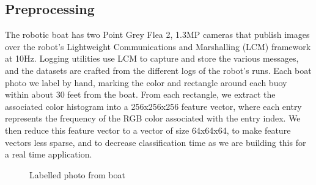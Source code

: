 \documentclass{article} %
\begin{document}
\subsection{Preprocessing}
The robotic boat has two Point Grey Flea 2, 1.3MP cameras that publish images over the robot's Lightweight 
Communications and Marshalling (LCM) framework at 10Hz. Logging utilities use LCM to capture and store the various messages, and the datasets are crafted from the different logs of the robot's runs.
Each boat photo we label by hand, marking the color and rectangle around each buoy within about 30 feet from the boat. From each rectangle, we extract the associated color histogram into a 256x256x256 feature vector, where each entry represents the frequency of the RGB color associated with the entry index. We then reduce this feature vector to a vector of size 64x64x64, to make feature vectors less sparse, and to decrease classification time as we are building this for a real time application.

\begin{figure}[h]
\begin{center}
\end{center}
\caption{Labelled photo from boat}
\end{figure}
\end{document}
